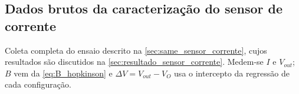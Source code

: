 
\begin{apendicesenv}

\chapter{Dados brutos da caracterização do sensor de corrente}
\label{apendice:ensaio_hall}

Coleta completa do ensaio descrito na \autoref{sec:same_sensor_corrente}, cujos
resultados são discutidos na \autoref{sec:resultado_sensor_corrente}. Medem-se
$I$ e $V_{out}$; $B$ vem da \autoref{eq:B_hopkinson} e
$\Delta V = V_{out} - V_O$ usa o intercepto da regressão de cada configuração.


\end{apendicesenv}
